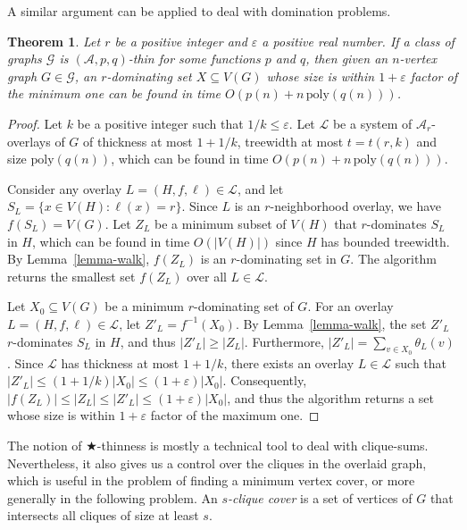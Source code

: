 \documentclass[a4paper,11pt]{article}
\newcommand{\Aa}{{\mathcal A}}
\newcommand{\GG}{{\mathcal G}}
\newcommand{\LL}{{\mathcal L}}
\newcommand{\poly}{\text{poly}}
\newtheorem{theorem}{Theorem}[section]
\begin{document}
A similar argument can be applied to deal with domination problems.

\begin{theorem}\label{thm-domin}
Let $r$ be a positive integer and $\varepsilon$ a positive real number.
If a class of graphs $\GG$ is $(\Aa,p,q)$-thin for some functions $p$ and $q$,
then given an $n$-vertex graph $G\in \GG$, an $r$-dominating set $X\subseteq V(G)$
whose size is within $1+\varepsilon$ factor of the minimum one can be found in time $O(p(n)+n\,\poly(q(n)))$.
\end{theorem}
\begin{proof}
Let $k$ be a positive integer such that $1/k\le \varepsilon$.
Let $\LL$ be a system of $\Aa_r$-overlays of $G$ of thickness at most $1+1/k$, treewidth at most $t=t(r,k)$ and size $\poly(q(n))$,
which can be found in time $O(p(n)+n\,\poly(q(n)))$.

Consider any overlay $L=(H,f,\ell)\in\LL$, and let $S_L=\{x\in V(H):\ell(x)=r\}$.
Since $L$ is an $r$-neighborhood overlay, we have $f(S_L)=V(G)$.
Let $Z_L$ be a minimum subset of $V(H)$ that $r$-dominates $S_L$ in $H$, which can be found in time $O(|V(H)|)$ since $H$ has bounded
treewidth.  By Lemma~\ref{lemma-walk}, $f(Z_L)$ is an $r$-dominating set in $G$.  The algorithm returns the smallest set $f(Z_L)$ over all $L\in\LL$.

Let $X_0\subseteq V(G)$ be a minimum $r$-dominating set of $G$.
For an overlay $L=(H,f,\ell)\in\LL$, let $Z'_L=f^{-1}(X_0)$. By Lemma~\ref{lemma-walk}, the set $Z'_L$ $r$-dominates $S_L$ in $H$,
and thus $|Z'_L|\ge |Z_L|$.  Furthermore, $|Z'_L|=\sum_{v\in X_0}\theta_L(v)$.
Since $\LL$ has thickness at most $1+1/k$, there exists an overlay $L\in\LL$ such that $|Z'_L|\le (1+1/k)|X_0|\le (1+\varepsilon)|X_0|$.
Consequently, $|f(Z_L)|\le |Z_L|\le |Z'_L|\le (1+\varepsilon)|X_0|$,
and thus the algorithm returns a set whose size is within $1+\varepsilon$ factor of the maximum one.
\end{proof}

The notion of $\bigstar$-thinness is mostly a technical tool to deal with clique-sums.  Nevertheless,
it also gives us a control over the cliques in the overlaid graph, which is useful in the
problem of finding a minimum vertex cover, or more generally in the following problem.
An \emph{$s$-clique cover} is a set of vertices of $G$ that intersects all cliques of size at least $s$.
\end{document}
